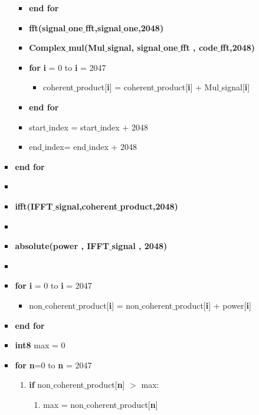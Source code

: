 \documentclass[journal,10pt,onecolumn]{article}
\begin{document}
\begin{enumerate}
\begin{enumerate}
\begin{itemize}
\begin{itemize}
                \item[] \textbf{end for}
                \item[] \textbf{fft(signal$\_$one$\_$fft,signal$\_$one,2048)}
                \item[] \textbf{Complex$\_$mul(Mul$\_$signal, signal$\_$one$\_$fft , code$\_$fft,2048)}
                \item[] \textbf{for} \textbf{i} =  0 to  \textbf{i} = 2047
                \begin{itemize}
                    \item[] coherent$\_$product[\textbf{i}] = coherent$\_$product[\textbf{i}] +  Mul$\_$signal[\textbf{i}]
                \end{itemize}
                \item[] \textbf{end for}
                \item[]   start$\_$index =  start$\_$index + 2048
                \item[]   end$\_$index= end$\_$index + 2048
            \end{itemize}
            \item[] \textbf{end for}
            \item[] 
            \item[] \textbf{ifft(IFFT$\_$signal,coherent$\_$product,2048)}
            \item[] 
            \item[] \textbf{absolute(power , IFFT$\_$signal , 2048)}
            \item[] 
            \item[] \textbf{for} \textbf{i} =  0 to  \textbf{i} = 2047
                \begin{itemize}
                    \item[] non$\_$coherent$\_$product[\textbf{i}] = non$\_$coherent$\_$product[\textbf{i}] +  power[\textbf{i}]
                \end{itemize}
            \item[] \textbf{end for}
            \item[] \textbf{int8} max = 0
            \item[] \textbf{for} \textbf{n}=0 to \textbf{n} = 2047
            \begin{enumerate}
                \item[] \textbf{if} non$\_$coherent$\_$product[\textbf{n}] $>$ max:
                \begin{enumerate}
                    \item[] max = non$\_$coherent$\_$product[\textbf{n}]

\end{enumerate}
\end{enumerate}
\end{itemize}
\end{enumerate}
\end{enumerate}
\end{document}
